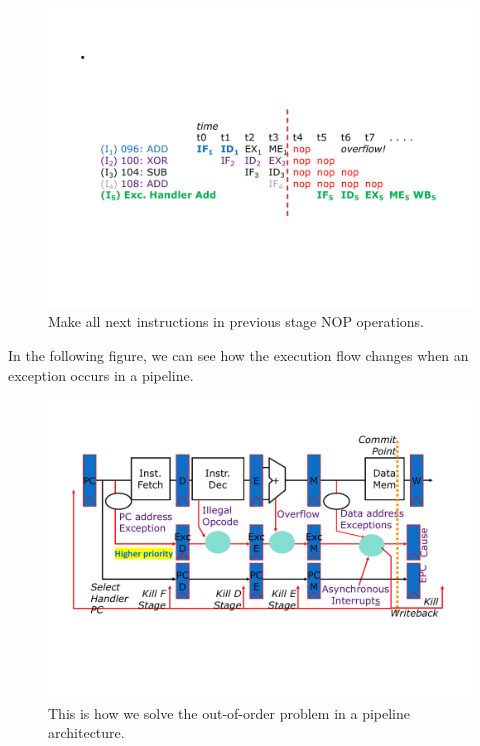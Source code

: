 \begin{figure}[!htp]
    \centering
    \includegraphics[width=\textwidth]{img/exceptions-in-the-5-stage-pipeline-4.pdf}
    \caption{Make all next instructions in previous stage NOP operations.}
    \label{fig: instruction reaches the commit point}
\end{figure}

\noindent
In the following figure, we can see how the execution flow changes when an exception occurs in a pipeline.

\begin{figure}[!htp]
    \centering
    \includegraphics[width=\textwidth]{img/exceptions-in-the-5-stage-pipeline-5.pdf}
    \caption{This is how we solve the out-of-order problem in a pipeline architecture.}
\end{figure}